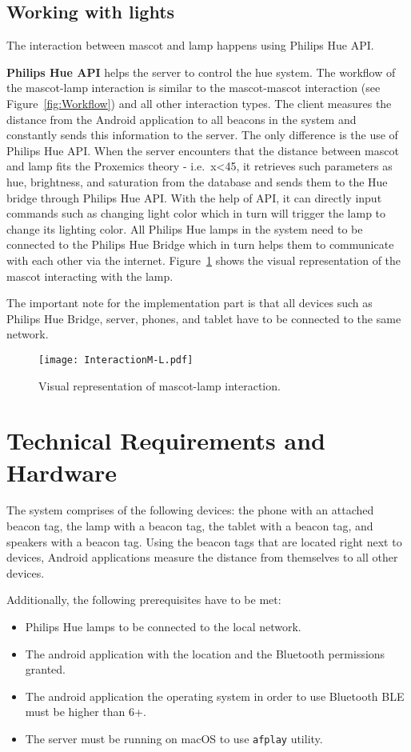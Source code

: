 \subsection{Working with lights}
\label{subsec:working-with-lights.}
The interaction between mascot and lamp happens using Philips Hue API\@.

\textbf{Philips Hue API} helps the server to control the hue system.
The workflow of the mascot-lamp interaction is similar to the mascot-mascot interaction (see Figure~\ref{fig:Workflow})
and all other interaction types.
The client measures the distance from the Android application to all beacons
in the system and constantly sends this information to the server.
The only difference is the use of Philips Hue API\@.
When the server encounters that the distance between mascot and lamp fits the Proxemics theory - i.e.\ x<45, it
retrieves such parameters as hue, brightness, and saturation from the database and sends them
to the Hue bridge through Philips Hue API\@.
With the help of API, it can directly input commands such as changing light color which in turn will trigger the lamp to
change its lighting color.
All Philips Hue lamps in the system need to be connected to the Philips Hue Bridge which in turn helps them
to communicate with each other via the internet.
Figure~\ref{fig:InteractionMl} shows the visual representation of the mascot interacting with the lamp.

The important note for the implementation part is that all devices such as Philips Hue Bridge, server,
phones, and tablet have to be connected to the same network.
\begin{figure}[hbt!]
    \centering
    \texttt{[image: InteractionM-L.pdf]}
    \caption{Visual representation of mascot-lamp interaction.}
    \label{fig:InteractionMl}
\end{figure}

\section{Technical Requirements and Hardware}
\label{sec:technical-requirements-and-hardware}
The system comprises of the following devices: the phone with an attached beacon tag,
the lamp with a beacon tag, the tablet with a beacon tag, and speakers with a beacon tag.
Using the beacon tags that are located right next to devices, Android applications
measure the distance from themselves to all other devices.

Additionally, the following prerequisites have to be met:
\begin{itemize}
    \item Philips Hue lamps to be connected to the local network.
    \item The android application with the location and the Bluetooth permissions granted.
    \item The android application the operating system in order to use Bluetooth BLE must be higher than 6+.
    \item The server must be running on macOS to use \texttt{afplay} utility.
\end{itemize}

